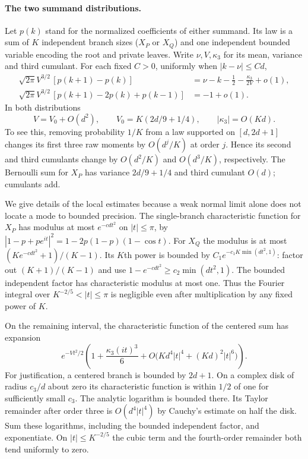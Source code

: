 \documentclass[11pt,a4paper]{article}
\numberwithin{equation}{section}
\begin{document}
\paragraph{The two summand distributions.}
Let $p(k)$ stand for the normalized coefficients of either summand.
Its law is a sum of $K$ independent branch sizes ($X_P$ or $X_Q$)
and one independent bounded variable encoding the root and private leaves.
Write $\nu,V,\kappa_3$ for its mean, variance and third cumulant.
For each fixed $C>0$, uniformly when $|k-\nu|\le Cd$,
\begin{align}
 \sqrt{2\pi}V^{3/2}\,[p(k+1)-p(k)]
 &=\nu-k-\tfrac12-\frac{\kappa_3}{2V}+o(1),\label{leaf:first}\\
 \sqrt{2\pi}V^{3/2}\,[p(k+1)-2p(k)+p(k-1)]&=-1+o(1).
 \label{leaf:second}
\end{align}
In both distributions
\[
 V=V_0+O(d^2),\qquad V_0=K(2d/9+1/4),\qquad |\kappa_3|=O(Kd).
\]
To see this, removing probability $1/K$ from a law supported on
$[d,2d+1]$ changes its first three raw moments by $O(d^j/K)$
at order $j$. Hence its second and third cumulants change by
$O(d^2/K)$ and $O(d^3/K)$, respectively. The Bernoulli sum for $X_P$
has variance $2d/9+1/4$ and third cumulant $O(d)$; cumulants add.

We give details of the local estimates because a weak normal limit
alone does not locate a mode to bounded precision. The single-branch
characteristic function for $X_P$ has modulus at most
$e^{-c d t^2}$ on $|t|\le\pi$, by
$|1-p+pe^{it}|^2=1-2p(1-p)(1-\cos t)$.
For $X_Q$ the modulus is at most $(K e^{-c d t^2}+1)/(K-1)$.
Its $K$th power is bounded by
$C_1e^{-c_1K\min(dt^2,1)}$: factor out $(K+1)/(K-1)$
and use $1-e^{-cdt^2}\ge c_2\min(dt^2,1)$. The bounded
independent factor has characteristic modulus at most one. Thus the
Fourier integral over $K^{-2/5}<|t|\le\pi$ is negligible even
after multiplication by any fixed power of $K$.

On the remaining interval, the characteristic function of the
centered sum has expansion
\[
 e^{-Vt^2/2}\left(1+\frac{\kappa_3(it)^3}{6}
       +O\big(Kd^4 |t|^4+(Kd)^2|t|^6\big)\right).
\]
For justification, a centered branch is bounded by $2d+1$.
On a complex disk of radius $c_3/d$ about zero its characteristic
function is within $1/2$ of one for sufficiently small $c_3$.
The analytic logarithm is bounded there. Its Taylor remainder after
order three is $O(d^4|t|^4)$ by Cauchy's estimate on half the disk.
Sum these logarithms, including the bounded independent factor,
and exponentiate. On $|t|\le K^{-2/5}$ the cubic term and the
fourth-order remainder both tend uniformly to zero.
\end{document}
